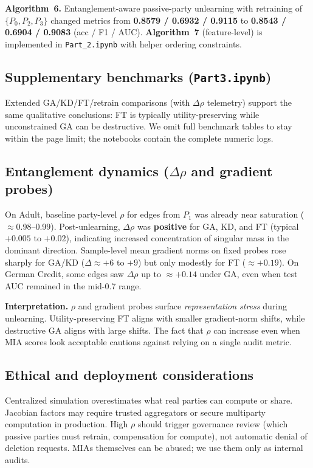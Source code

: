\documentclass[sigconf,nonacm]{acmart}
\begin{document}
\textbf{Algorithm~6.} Entanglement-aware passive-party unlearning with retraining of $\{P_0,P_2,P_3\}$ changed metrics from \textbf{0.8579 / 0.6932 / 0.9115} to \textbf{0.8543 / 0.6904 / 0.9083} (acc / F1 / AUC). \textbf{Algorithm~7} (feature-level) is implemented in \texttt{Part\_2.ipynb} with helper ordering constraints.

\subsection{Supplementary benchmarks (\texttt{Part3.ipynb})}
Extended GA/KD/FT/retrain comparisons (with $\Delta\rho$ telemetry) support the same qualitative conclusions: FT is typically utility-preserving while unconstrained GA can be destructive. We omit full benchmark tables to stay within the page limit; the notebooks contain the complete numeric logs.

\subsection{Entanglement dynamics (\texorpdfstring{$\Delta\rho$}{Delta rho} and gradient probes)}
On Adult, baseline party-level $\rho$ for edges from $P_1$ was already near saturation ($\approx$0.98--0.99). Post-unlearning, $\Delta\rho$ was \textbf{positive} for GA, KD, and FT (typical $+0.005$ to $+0.02$), indicating increased concentration of singular mass in the dominant direction. Sample-level mean gradient norms on fixed probes rose sharply for GA/KD ($\Delta \approx +6$ to $+9$) but only modestly for FT ($\approx +0.19$). On German Credit, some edges saw $\Delta\rho$ up to $\approx +0.14$ under GA, even when test AUC remained in the mid-0.7 range.

\textbf{Interpretation.} $\rho$ and gradient probes surface \emph{representation stress} during unlearning. Utility-preserving FT aligns with smaller gradient-norm shifts, while destructive GA aligns with large shifts. The fact that $\rho$ can increase even when MIA scores look acceptable cautions against relying on a single audit metric.

\subsection{Ethical and deployment considerations}
Centralized simulation overestimates what real parties can compute or share. Jacobian factors may require trusted aggregators or secure multiparty computation in production. High $\rho$ should trigger governance review (which passive parties must retrain, compensation for compute), not automatic denial of deletion requests. MIAs themselves can be abused; we use them only as internal audits.
\end{document}
